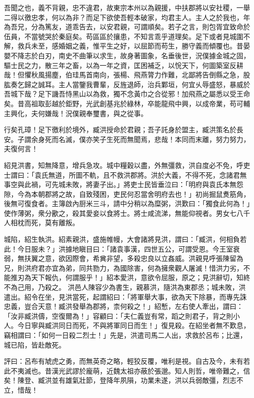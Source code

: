 \begin{pinyinscope}
 
 吾聞之也，義不背親，忠不違君，故東宗本州以為親援，中扶郡將以安社稷，一舉二得以徼忠孝，何以為非？而足下欲使吾輕本破家，均君主人。主人之於我也，年為吾兄，分為篤友，道乖告去，以安君親，可謂順矣。若子之言，則包胥宜致命於伍員，不當號哭於秦庭矣。苟區區於攘患，不知言乖乎道理矣。足下或者見城圍不解，救兵未至，感婚姻之義，惟平生之好，以屈節而苟生，勝守義而傾覆也。昔晏嬰不降志於白刃，南史不曲筆以求生，故身著圖象，名垂後世，況僕據金城之固，驅士民之力，散三年之畜，以為一年之資，匡困補乏，以恱天下，何圖築室反耕哉！但懼秋風揚塵，伯珪馬首南向，張楊、飛燕膂力作難，北鄙將告倒縣之急，股肱奏乞歸之誠耳。主人當鑒我曹輩，反旌退師，治兵鄴垣，何宜乆辱盛怒，暴威於吾城下哉？足下譏吾恃黑山以為救，獨不念黃巾之合從邪！加飛燕之屬悉以受王命矣。昔高祖取彭越於鉅野，光武創基兆於綠林，卒能龍飛中興，以成帝業，苟可輔主興化，夫何嫌哉！況僕親奉璽書，與之從事。
 
 
 
 
 行矣孔璋！足下徼利於境外，臧洪授命於君親；吾子託身於盟主，臧洪策名於長安。子謂余身死而名滅，僕亦笑子生死而無聞焉，悲哉！本同而末離，努力努力，夫復何言！
 
 
 
 
 紹見洪書，知無降意，增兵急攻。城中糧穀以盡，外無彊救，洪自度必不免，呼吏士謂曰：「袁氏無道，所圖不軌，且不救洪郡將。洪於大義，不得不死，念諸君無事空與此禍，可先城未敗，將妻子出。」將吏士民皆垂泣曰：「明府與袁氏本無怨隙，今為本朝郡將之故，自致殘困，吏民何忍當舍明府去也！」初尚掘鼠煑筋角，後無可復食者。主簿啟內厨米三斗，請中分稍以為糜粥，洪歎曰：「獨食此何為！」使作薄粥，衆分歠之，殺其愛妾以食將士。將士咸流涕，無能仰視者。男女七八千人相枕而死，莫有離叛。
 
 
城陷，紹生執洪。紹素親洪，盛施帷幔，大會諸將見洪，謂曰：「臧洪，何相負若此！今日服未？」洪據地瞋目曰：「諸袁事漢，四世五公，可謂受恩。今王室衰弱，無扶翼之意，欲因際會，希兾非望，多殺忠良以立姦威。洪親見呼張陳留為兄，則洪府君亦宜為弟，同共勠力，為國除害，何為擁衆觀人屠滅！惜洪力劣，不能推刃為天下報仇，何謂服乎！」紹本愛洪，意欲令屈服，原之；見洪辭切，知終不為己用，乃殺之。
 洪邑人陳容少為書生，親慕洪，隨洪為東郡丞；城未敗，洪遣出。紹令在坐，見洪當死，起謂紹曰：「將軍舉大事，欲為天下除暴，而專先誅忠義，豈合天意！臧洪發舉為郡將，柰何殺之！」紹慙，左右使人牽出，謂曰：「汝非臧洪儔，空復爾為！」容顧曰：「夫仁義豈有常，蹈之則君子，背之則小人。今日寧與臧洪同日而死，不與將軍同日而生！」復見殺。在紹坐者無不歎息，竊相謂曰：「如何一日殺二烈士！」先是，洪遣司馬二人出，求救於呂布；比還，城已陷，皆赴敵死。
 
 
 
 
 評曰：呂布有虓虎之勇，而無英奇之略，輕狡反覆，唯利是視。自古及今，未有若此不夷滅也。昔漢光武謬於龐萌，近魏太祖亦蔽於張邈。知人則哲，唯帝難之，信矣！陳登、臧洪並有雄氣壯節，登降年夙隕，功業未遂，洪以兵弱敵彊，烈志不立，惜哉！
 
 
\end{pinyinscope}